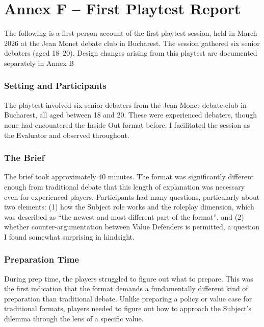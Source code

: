 \section*{Annex F -- First Playtest Report}

The following is a first-person account of the first playtest session, held in March 2026 at the Jean Monet debate club in Bucharest. The session gathered six senior debaters (aged 18--20). Design changes arising from this playtest are documented separately in Annex B

\subsubsection{Setting and Participants}

The playtest involved six senior debaters from the Jean Monet debate club in Bucharest, all aged between 18 and 20. These were experienced debaters, though none had encountered the Inside Out format before. I facilitated the session as the Evaluator and observed throughout.

\subsubsection{The Brief}

The brief took approximately 40 minutes. The format was significantly different enough from traditional debate that this length of explanation was necessary even for experienced players. Participants had many questions, particularly about two elements: (1) how the Subject role works and the roleplay dimension, which was described as ``the newest and most different part of the format'', and (2) whether counter-argumentation between Value Defenders is permitted, a question I found somewhat surprising in hindsight.

\subsubsection{Preparation Time}

During prep time, the players struggled to figure out what to prepare. This was the first indication that the format demands a fundamentally different kind of preparation than traditional debate. Unlike preparing a policy or value case for traditional formats, players needed to figure out how to approach the Subject's dilemma through the lens of a specific value.

